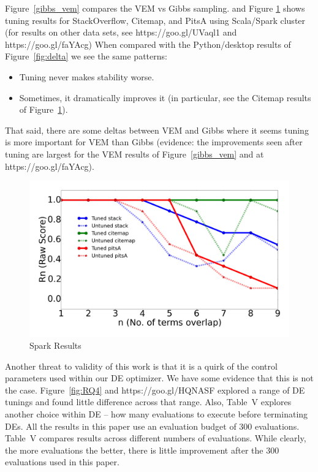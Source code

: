 \documentclass[10pt,conference]{IEEEtran}
\newcommand{\bi}{\begin{itemize}}
\newcommand{\ei}{\end{itemize}}
\theoremstyle{break}
\begin{document}
  Figure~\ref{gibbs_vem} compares the  VEM vs Gibbs sampling.
  and Figure
   \ref{python_spark} shows tuning results for StackOverflow, Citemap, and PitsA
   using Scala/Spark cluster (for results on other data sets, see
   https://goo.gl/UVaql1 and https://goo.gl/faYAcg)
   When compared with the Python/desktop results of
   Figure~\ref{fig:delta} we see the same patterns:
   \bi
 \item Tuning never makes stability worse.
 \item Sometimes, it dramatically improves it (in particular, see the Citemap results
   of  Figure~\ref{python_spark}).
   \ei
   That said, there are some deltas between VEM and Gibbs where it seems tuning
   is more important for VEM than Gibbs (evidence: the improvements seen after
   tuning are largest for the  VEM results of  Figure~\ref{gibbs_vem} and at  https://goo.gl/faYAcg).

   
\begin{figure}[!htbp]
  \captionsetup{justification=centering}
  \includegraphics[width=\linewidth]{./fig/spark.png}
  \caption{Spark Results}
  \label{python_spark}
\end{figure}

Another threat to validity of this work is that it is a quirk of the control
parameters used within our DE optimizer.
We have some evidence that this is not the case.
Figure~\ref{fig:RQ4} and https://goo.gl/HQNASF explored a range of DE tunings and found
little difference across that range. Also, Table~V explores another choice within DE -- how
many evaluations to execute before terminating DEs. All the results in this paper use an
evaluation budget of 300 evaluations. Table~V
compares results across different numbers of evaluations. While clearly,
the more evaluations the better, there is little improvement after the
300 evaluations used in this paper.
\end{document}
